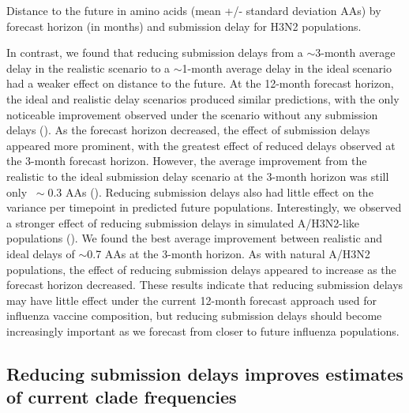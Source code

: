 \documentclass[9pt,lineno]{elife}
\begin{document}
\begin{table}[htb]
  \begin{center}
    
    \caption{Distance to the future in amino acids (mean +/- standard deviation AAs) by forecast horizon (in months) and submission delay for H3N2 populations.}
    \label{tab:h3n2_distances_to_the_future}
  \end{center}
\end{table}

In contrast, we found that reducing submission delays from a $\sim$3-month average delay in the realistic scenario to a $\sim$1-month average delay in the ideal scenario had a weaker effect on distance to the future.
At the 12-month forecast horizon, the ideal and realistic delay scenarios produced similar predictions, with the only noticeable improvement observed under the scenario without any submission delays ().
As the forecast horizon decreased, the effect of submission delays appeared more prominent, with the greatest effect of reduced delays observed at the 3-month forecast horizon.
However, the average improvement from the realistic to the ideal submission delay scenario at the 3-month horizon was still only $~\sim$0.3 AAs ().
Reducing submission delays also had little effect on the variance per timepoint in predicted future populations.
Interestingly, we observed a stronger effect of reducing submission delays in simulated A/H3N2-like populations ().
We found the best average improvement between realistic and ideal delays of $\sim$0.7 AAs at the 3-month horizon.
As with natural A/H3N2 populations, the effect of reducing submission delays appeared to increase as the forecast horizon decreased.
These results indicate that reducing submission delays may have little effect under the current 12-month forecast approach used for influenza vaccine composition, but reducing submission delays should become increasingly important as we forecast from closer to future influenza populations.

\subsection{Reducing submission delays improves estimates of current clade frequencies}
\end{document}
